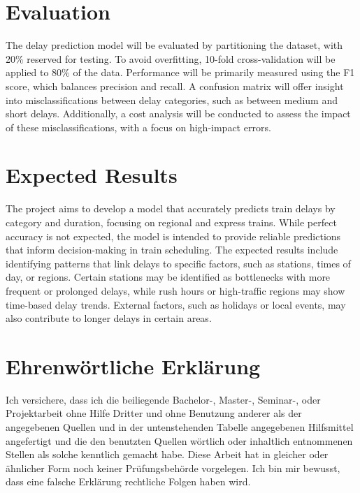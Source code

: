 \documentclass[a4paper,oneside,bibliography=totoc]{scrbook}
\begin{document}
\chapter{Evaluation}\label{ch:eval}
The delay prediction model will be evaluated by partitioning the dataset, with 20\% reserved for testing.
To avoid overfitting, 10-fold cross-validation will be applied to 80\% of the data.
Performance will be primarily measured using the F1 score, which balances precision and recall.
A confusion matrix will offer insight into misclassifications between delay categories,
such as between medium and short delays.
Additionally, a cost analysis will be conducted to assess the impact of these misclassifications,
with a focus on high-impact errors.

\chapter{Expected Results}\label{sec:expected_results}
The project aims to develop a model that accurately predicts train delays by category and duration, focusing on regional and express trains.
While perfect accuracy is not expected, the model is intended to provide reliable predictions that inform decision-making in train scheduling.
The expected results include identifying patterns that link delays to specific factors, such as stations, times of day, or regions.
Certain stations may be identified as bottlenecks with more frequent or prolonged delays, while rush hours or high-traffic regions may show time-based delay trends.
External factors, such as holidays or local events, may also contribute to longer delays in certain areas.


\backmatter

\chapter{Ehrenwörtliche Erklärung}
Ich versichere, dass ich die beiliegende Bachelor-, Master-, Seminar-, oder
Projektarbeit ohne Hilfe Dritter und ohne Benutzung anderer als der angegebenen
Quellen und in der untenstehenden Tabelle angegebenen Hilfsmittel angefertigt
und die den benutzten Quellen wörtlich oder inhaltlich entnommenen Stellen als
solche kenntlich gemacht habe. Diese Arbeit hat in gleicher oder ähnlicher Form
noch keiner Prüfungsbehörde vorgelegen. Ich bin mir bewusst, dass eine falsche
Erklärung rechtliche Folgen haben wird.
\end{document}
